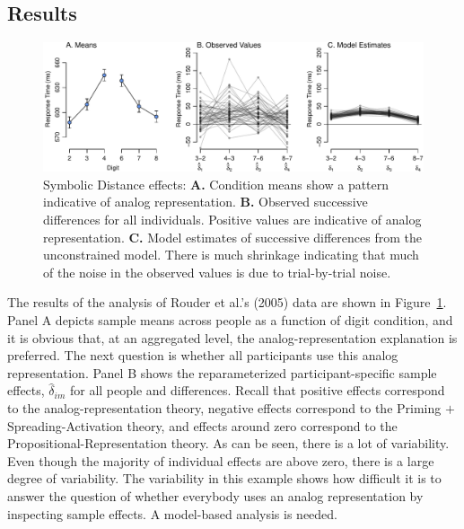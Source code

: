 \documentclass[english,,man]{apa6}
\begin{document}
\hypertarget{results-1}{%
\subsection{Results}\label{results-1}}

\begin{figure}
\includegraphics{p_files/figure-latex/ld5-1} \caption{Symbolic Distance effects: \textbf{A.} Condition means show a pattern indicative of analog representation.  \textbf{B.} Observed successive differences for all individuals.  Positive values are indicative of analog representation. \textbf{C.} Model estimates of successive differences from the unconstrained model.  There is much shrinkage indicating that much of the noise in the observed values is due to trial-by-trial noise.}\label{fig:ld5}
\end{figure}

The results of the analysis of Rouder et al.'s (2005) data are shown in Figure~\ref{fig:ld5}. Panel A depicts sample means across people as a function of digit condition, and it is obvious that, at an aggregated level, the analog-representation explanation is preferred. The next question is whether all participants use this analog representation. Panel B shows the reparameterized participant-specific sample effects, \(\hat{\delta}_{im}\) for all people and differences. Recall that positive effects correspond to the analog-representation theory, negative effects correspond to the Priming \(+\) Spreading-Activation theory, and effects around zero correspond to the Propositional-Representation theory. As can be seen, there is a lot of variability. Even though the majority of individual effects are above zero, there is a large degree of variability. The variability in this example shows how difficult it is to answer the question of whether everybody uses an analog representation by inspecting sample effects. A model-based analysis is needed.
\end{document}
